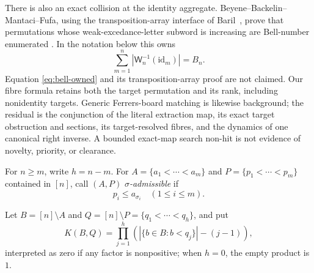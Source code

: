 \documentclass[a4paper,10pt]{amsart}
\theoremstyle{remark}
\newcommand{\WEX}{\mathsf W}
\begin{document}
There is also an exact collision at the identity aggregate.
Beyene--Backelin--Mantaci--Fufa, using the transposition-array interface of
Baril~\cite{Baril2007,Baril2013}, prove that permutations whose
weak-excedance-letter subword is increasing are Bell-number enumerated
\cite[Theorem~27]{BeyeneBackelinMantaciFufa2023}.  In the notation below this
owns
\begin{equation}\label{eq:bell-owned}
 \sum_{m=1}^n |\WEX_n^{-1}(\mathrm{id}_m)|=B_n.
\end{equation}
Equation \eqref{eq:bell-owned} and its transposition-array proof are not
claimed.  Our fibre formula retains both the target permutation and its rank,
including nonidentity targets.  Generic Ferrers-board matching is likewise
background; the residual is the conjunction of the literal extraction map,
its exact target obstruction and sections, its target-resolved fibres, and
the dynamics of one canonical right inverse.  A bounded exact-map search
non-hit is not evidence of novelty, priority, or clearance.

For $n\ge m$, write $h=n-m$.  For $A=\{a_1<\cdots<a_m\}$ and
$P=\{p_1<\cdots<p_m\}$ contained in $[n]$, call $(A,P)$
\emph{$\sigma$-admissible} if
\begin{equation}\label{eq:admissible}
 p_i\le a_{\sigma_i}\quad(1\le i\le m).
\end{equation}
\begin{samepage}
Let $B=[n]\setminus A$ and
$Q=[n]\setminus P=\{q_1<\cdots<q_h\}$, and put
\begin{equation}\label{eq:completion}
 K(B,Q)=\prod_{j=1}^h
 \left(|\{b\in B:b<q_j\}|-(j-1)\right),
\end{equation}
interpreted as zero if any factor is nonpositive; when \(h=0\), the empty
product is \(1\).
\end{samepage}
\end{document}
